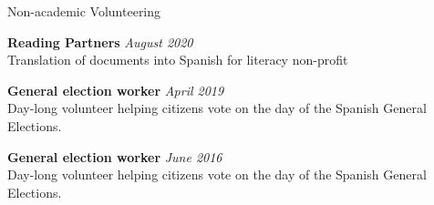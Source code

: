 \documentclass{resume}
\newcommand{\cvitem}[3]{
    {\bf #1} \hfill {\em \small #2} \\ 
    {\small#3 }
}
\begin{document}
\begin{rSection}{Non-academic Volunteering}

\cvitem{Reading Partners}{August 2020}{Translation of documents into Spanish for literacy non-profit}

\cvitem{General election worker}{April 2019}{Day-long volunteer helping citizens vote on the day of the Spanish General Elections.}

\cvitem{General election worker}{June 2016}{Day-long volunteer helping citizens vote on the day of the Spanish General Elections.}

\end{rSection}





\end{document}
